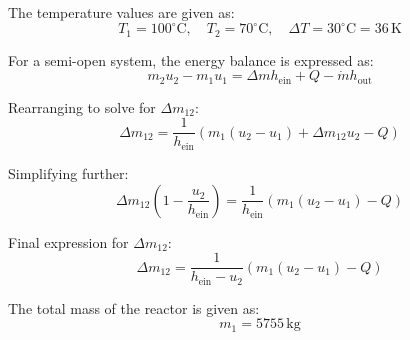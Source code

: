 The temperature values are given as:  
\[
T_1 = 100^\circ\text{C}, \quad T_2 = 70^\circ\text{C}, \quad \Delta T = 30^\circ\text{C} = 36 \, \text{K}
\]  

For a semi-open system, the energy balance is expressed as:  
\[
m_2 u_2 - m_1 u_1 = \Delta m h_{\text{ein}} + Q - \dot{m} h_{\text{out}}
\]  

Rearranging to solve for \( \Delta m_{12} \):  
\[
\Delta m_{12} = \frac{1}{h_{\text{ein}}} \left( m_1 (u_2 - u_1) + \Delta m_{12} u_2 - Q \right)
\]  

Simplifying further:  
\[
\Delta m_{12} \left( 1 - \frac{u_2}{h_{\text{ein}}} \right) = \frac{1}{h_{\text{ein}}} \left( m_1 (u_2 - u_1) - Q \right)
\]  

Final expression for \( \Delta m_{12} \):  
\[
\Delta m_{12} = \frac{1}{h_{\text{ein}} - u_2} \left( m_1 (u_2 - u_1) - Q \right)
\]  

The total mass of the reactor is given as:  
\[
m_1 = 5755 \, \text{kg}
\]